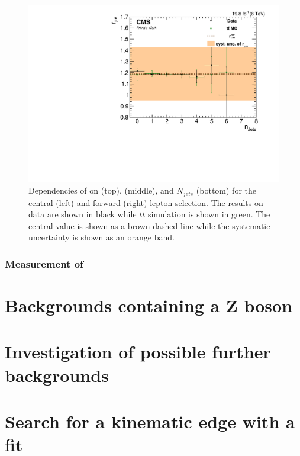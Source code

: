 \begin{figure}[htbp]
\begin{minipage}[t]{0.49\textwidth}
\includegraphics[width=\textwidth]{plots/BG/rmue/8TeVrRatioDataVsMCControl_nJets_Forward_Full2012.pdf}
\end{minipage}
\caption{Dependencies of \rmue on \mll (top), \MET (middle), and $N_{jets}$ (bottom) for the central (left) and forward (right) lepton selection. The results on data are shown in black while $t\bar{t}$ simulation is shown in green. The central value is shown as a brown dashed line while the systematic uncertainty is shown as an orange band.}
\label{fig:rmueDependencies}
\end{figure} 
\subsubsection{Measurement of \RT}

\section{Backgrounds containing a Z boson}
\section{Investigation of possible further backgrounds}
\section{Search for a kinematic edge with a fit}
